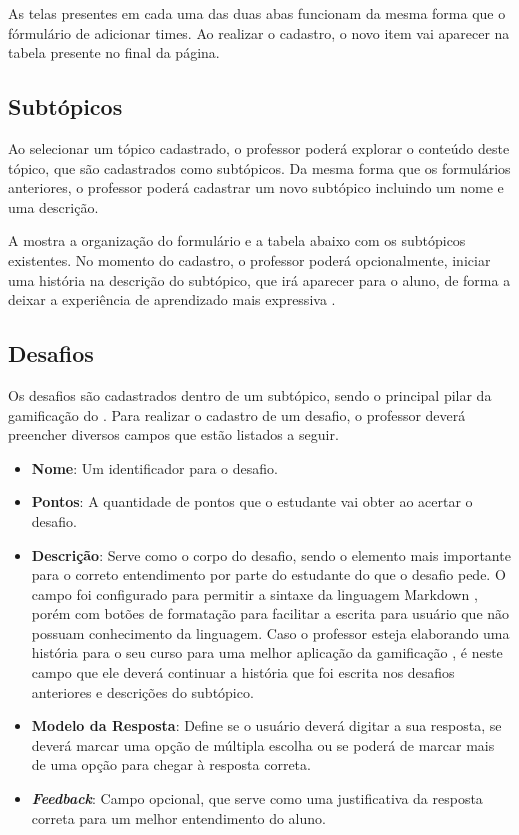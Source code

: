 As telas presentes em cada uma das duas abas funcionam da mesma forma que o fórmulário de adicionar times. Ao realizar o cadastro, o novo item vai aparecer na tabela presente no final da página.

\subsection{Subtópicos}

Ao selecionar um tópico cadastrado, o professor poderá explorar o conteúdo deste tópico, que são cadastrados como subtópicos. Da mesma forma que os formulários anteriores, o professor poderá cadastrar um novo subtópico incluindo um nome e uma descrição.


A  mostra a organização do formulário e a tabela abaixo com os subtópicos existentes. No momento do cadastro, o professor poderá opcionalmente, iniciar uma história na descrição do subtópico, que irá aparecer para o aluno, de forma a deixar a experiência de aprendizado mais expressiva \cite{gamification_motivates}.

\subsection{Desafios}

Os desafios são cadastrados dentro de um subtópico, sendo o principal pilar da gamificação do \appName. Para realizar o cadastro de um desafio, o professor deverá preencher diversos campos que estão listados a seguir.

\begin{itemize}
    \item \textbf{Nome}: Um identificador para o desafio.
    \item \textbf{Pontos}: A quantidade de pontos que o estudante vai obter ao acertar o desafio.
    \item \textbf{Descrição}: Serve como o corpo do desafio, sendo o elemento mais importante para o correto entendimento por parte do estudante do que o desafio pede. O campo foi configurado para permitir a sintaxe da linguagem Markdown \cite{markdown}, porém com botões de formatação para facilitar a escrita para usuário que não possuam conhecimento da linguagem. Caso o professor esteja elaborando uma história para o seu curso para uma melhor aplicação da gamificação \cite{gamification_motivates}, é neste campo que ele deverá continuar a história que foi escrita nos desafios anteriores e descrições do subtópico.
    \item \textbf{Modelo da Resposta}: Define se o usuário deverá digitar a sua resposta, se deverá marcar uma opção de múltipla escolha ou se poderá de marcar mais de uma opção para chegar à resposta correta.
    \item \textbf{\textit{Feedback}}: Campo opcional, que serve como uma justificativa da resposta correta para um melhor entendimento do aluno.
\end{itemize}


